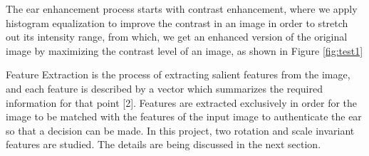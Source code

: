 The ear enhancement process starts with contrast enhancement, where we apply histogram equalization to improve the contrast in an image in order to stretch out its intensity range, from which, we get an enhanced version of the original image by maximizing the contrast level of an image, as shown in Figure \ref{fig:test1} 

Feature Extraction is the process of extracting salient features from the image, and each feature is described by a vector which summarizes the required information for that point [2]. Features are extracted exclusively in order for the image to be matched with the features of the input image to authenticate the ear so that a decision can be made. In this project, two rotation and scale invariant features are studied. The details are being discussed in the next section.



